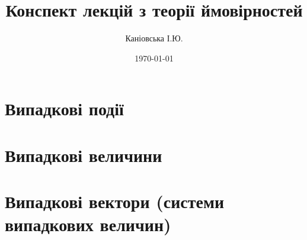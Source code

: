 \documentclass{report}
\author{Каніовська І.Ю.}
\title{Конспект лекцій з теорії ймовірностей}
\date{\today}
\begin{document}
 
    \maketitle
    \tableofcontents
    \chapter{Випадкові події}
        
        
        
        
    \chapter{Випадкові величини}
        
        
        
    \chapter{Випадкові вектори (системи випадкових величин)}
        
\end{document}
